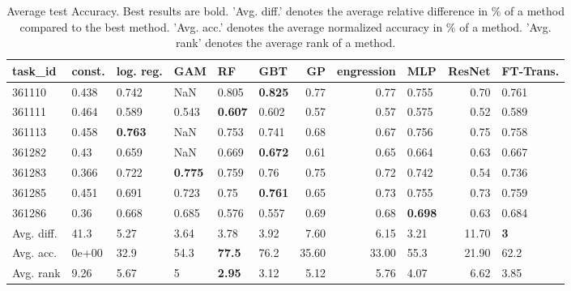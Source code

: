 \begin{table}[ht!]
\centering
\begingroup\footnotesize
\begin{tabular}{llllllrrlrl}
  \hline
\hline
task\_id & const. & log. reg. & GAM & RF & GBT & GP & engression & MLP & ResNet & FT-Trans. \\ 
  \hline
361110 & 0.438 & 0.742 & NaN & 0.805 & \textbf{0.825} & 0.77 & 0.77 & 0.755 & 0.70 & 0.761 \\ 
  361111 & 0.464 & 0.589 & 0.543 & \textbf{0.607} & 0.602 & 0.57 & 0.57 & 0.575 & 0.52 & 0.589 \\ 
  361113 & 0.458 & \textbf{0.763} & NaN & 0.753 & 0.741 & 0.68 & 0.67 & 0.756 & 0.75 & 0.758 \\ 
  361282 & 0.43 & 0.659 & NaN & 0.669 & \textbf{0.672} & 0.61 & 0.65 & 0.664 & 0.63 & 0.667 \\ 
  361283 & 0.366 & 0.722 & \textbf{0.775} & 0.759 & 0.76 & 0.75 & 0.72 & 0.742 & 0.54 & 0.736 \\ 
  361285 & 0.451 & 0.691 & 0.723 & 0.75 & \textbf{0.761} & 0.65 & 0.73 & 0.755 & 0.73 & 0.759 \\ 
  361286 & 0.36 & 0.668 & 0.685 & 0.576 & 0.557 & 0.69 & 0.68 & \textbf{0.698} & 0.63 & 0.684 \\ 
   \hline
Avg. diff. & 41.3 & 5.27 & 3.64 & 3.78 & 3.92 & 7.60 & 6.15 & 3.21 & 11.70 & \textbf{3} \\ 
  Avg. acc. & 0e+00 & 32.9 & 54.3 & \textbf{77.5} & 76.2 & 35.60 & 33.00 & 55.3 & 21.90 & 62.2 \\ 
  Avg. rank & 9.26 & 5.67 & 5 & \textbf{2.95} & 3.12 & 5.12 & 5.76 & 4.07 & 6.62 & 3.85 \\ 
   \hline
\hline
\end{tabular}
\endgroup
\caption{Average test Accuracy. 
                  Best results are bold. 
                  'Avg. diff.' denotes the average relative difference in \% of a method compared to the best method.
                  'Avg. acc.' denotes the average normalized accuracy in \% of a method.
                  'Avg. rank' denotes the average rank of a method.} 
\label{TABLES/table_results_Accuracy_num_and_cat_features}
\end{table}

